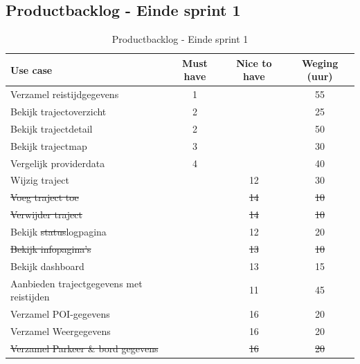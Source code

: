 \documentclass[a4paper]{article}
\begin{document}
\newpage

\subsection{Productbacklog - Einde sprint 1}


\begin{table}[H]
\centering
\begin{tabular}{|l|c|c|c|} 
\hline
\textbf{Use case} & \textbf{Must have} & \textbf{Nice to have}  & \textbf{Weging (uur)}\\ \hline \hline
Verzamel reistijdgegevens & 1 & & 55 \\ \hline 
Bekijk trajectoverzicht & 2 & & 25 \\ \hline 
Bekijk trajectdetail & 2 & & 50 \\ \hline 
Bekijk trajectmap & 3 & & 30 \\ \hline 
Vergelijk providerdata & 4 & & 40 \\ \hline
Wijzig traject & & 12 & 30 \\ \hline
\st{Voeg traject toe} & & \st{14} & \st{10} \\ \hline
\st{Verwijder traject} & & \st{14} & \st{10} \\ \hline
Bekijk \st{status}logpagina & & 12 & 20 \\ \hline 
\st{Bekijk infopagina's} & & \st{13} & \st{10} \\ \hline 
Bekijk dashboard & & 13 & 15 \\ \hline 
Aanbieden trajectgegevens met reistijden & & 11 & 45 \\ \hline
Verzamel POI-gegevens & & 16 & 20 \\ \hline
Verzamel Weergegevens & & 16 & 20 \\ \hline
\st{Verzamel Parkeer \& bord gegevens} & & \st{16} & \st{20} \\ \hline
\end{tabular}
\caption{Productbacklog - Einde sprint 1}
\end{table}

\newpage

\listoffigures
\newpage
\listoftables
\end{document}

